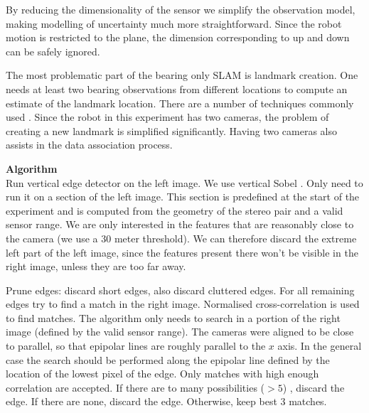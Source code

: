 By reducing the dimensionality of the sensor we simplify the
observation model, making modelling of uncertainty much more
straightforward. Since the robot motion is restricted to the plane,
the dimension corresponding to up and down can be safely ignored.

The most problematic part of the bearing only SLAM is landmark
creation. One needs at least two bearing observations from different
locations to compute an estimate of the landmark location. There are a
number of techniques commonly used \cite{bearing_only_slam}. Since the
robot in this experiment has two cameras, the problem of creating a
new landmark is simplified significantly. Having two cameras also
assists in the data association process. 





{\bf Algorithm }\\
Run vertical edge detector on the left image. We use vertical Sobel
\cite{Hartley2004}. Only need to run it on a section of the left
image. This section is predefined at the start of the experiment and
is computed from the geometry of the stereo pair and a valid sensor
range. We are only interested in the features that are reasonably
close to the camera (we use a 30 meter threshold). We can therefore
discard the extreme left part of the left image, since the features
present there won't be visible in the right image, unless they are too
far away.

Prune edges: discard short edges, also discard cluttered edges. For
all remaining edges try to find a match in the right image. Normalised
cross-correlation is used to find matches. The algorithm only needs to
search in a portion of the right image (defined by the valid sensor
range). The cameras were aligned to be close to parallel, so that
epipolar lines are roughly parallel to the $x$ axis. In the general
case the search should be performed along the epipolar line defined by
the location of the lowest pixel of the edge. Only matches with high
enough correlation are accepted. If there are to many possibilities
($> 5$) , discard the edge. If there are none, discard the
edge. Otherwise, keep best 3 matches.

